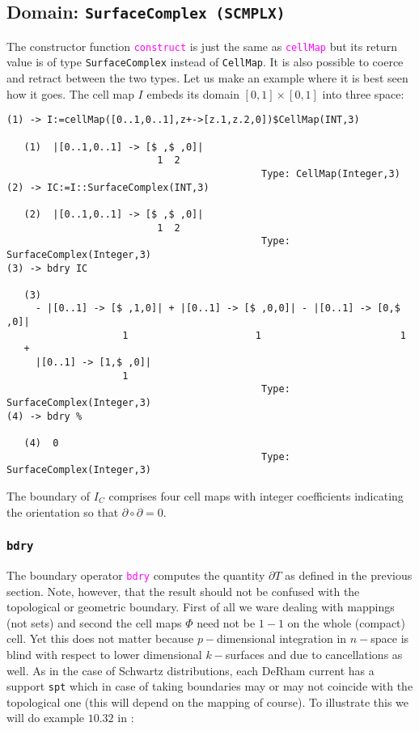 \documentclass[12pt,a4paper]{article}
\newcommand{\spadfun}[1]{\textcolor{magenta}{\tt #1}}
\begin{document}
\subsection{Domain: {\tt SurfaceComplex (SCMPLX)}}
The constructor function \spadfun{construct} is just the same as
\spadfun{cellMap} but its return value is of type {\tt SurfaceComplex}
instead of {\tt CellMap}. It is also possible to coerce and retract
between the two types.
Let us make an example where it is best seen how it goes. The cell map
$I$ embeds its domain $[0,1]\times[0,1]$ into three space:
\scriptsize
\begin{verbatim}
(1) -> I:=cellMap([0..1,0..1],z+->[z.1,z.2,0])$CellMap(INT,3)

   (1)  |[0..1,0..1] -> [$ ,$ ,0]|
                          1  2
                                            Type: CellMap(Integer,3)
(2) -> IC:=I::SurfaceComplex(INT,3)

   (2)  |[0..1,0..1] -> [$ ,$ ,0]|
                          1  2
                                            Type: SurfaceComplex(Integer,3)
(3) -> bdry IC

   (3)
     - |[0..1] -> [$ ,1,0]| + |[0..1] -> [$ ,0,0]| - |[0..1] -> [0,$ ,0]|
                    1                      1                        1
   + 
     |[0..1] -> [1,$ ,0]|
                    1
                                            Type: SurfaceComplex(Integer,3)
(4) -> bdry %

   (4)  0
                                            Type: SurfaceComplex(Integer,3)
\end{verbatim}
\normalsize
The boundary of $I_C$ comprises four cell maps with integer coefficients
indicating the orientation so that $\partial\circ\partial=0$. 
\subsubsection{\tt bdry}
The boundary operator \spadfun{bdry} computes the quantity $\partial T$
as defined in the previous section. Note, however, that the result should
not be confused with the topological or geometric boundary. First
of all we ware dealing with mappings (not sets) and second the cell
maps $\Phi$ need not be $1-1$ on the whole (compact) cell. Yet this
does not matter because $p-$dimensional integration in $n-$space is
blind with respect to lower dimensional $k-$surfaces and due to 
cancellations as well.
As in the case of Schwartz distributions, each DeRham current has
a support {\tt spt} which in case of taking boundaries may or may not
coincide with the topological one (this will depend on the mapping
of course). To illustrate this we will do example $10.32$ in \cite{PMA}:
\end{document}
